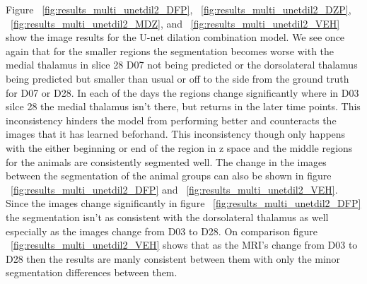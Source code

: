 Figure ~\ref{fig:results_multi_unetdil2_DFP}, ~\ref{fig:results_multi_unetdil2_DZP}, ~\ref{fig:results_multi_unetdil2_MDZ}, and ~\ref{fig:results_multi_unetdil2_VEH} show the image results for the U-net dilation combination model. 
We see once again that for the smaller regions the segmentation becomes worse with the medial thalamus in slice 28 D07 not being predicted or the dorsolateral thalamus being predicted but smaller than usual or off to the side from the ground truth for D07 or D28. 
In each of the days the regions change significantly where in D03 silce 28 the medial thalamus isn't there, but returns in the later time points.
This inconsistency hinders the model from performing better and counteracts the images that it has learned beforhand. 
This inconsistency though only happens with the either beginning or end of the region in z space and the middle regions for the animals are consistently segmented well. 
The change in the images between the segmentation of the animal groups can also be shown in figure ~\ref{fig:results_multi_unetdil2_DFP} and ~\ref{fig:results_multi_unetdil2_VEH}.
Since the images change significantly in figure ~\ref{fig:results_multi_unetdil2_DFP} the segmentation isn't as consistent with the dorsolateral thalamus as well especially as the images change from D03 to D28.
On comparison figure ~\ref{fig:results_multi_unetdil2_VEH} shows that as the MRI's change from D03 to D28 then the results are manly consistent between them with only the minor segmentation differences between them. 


